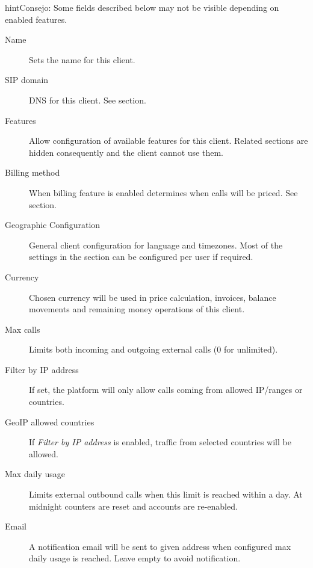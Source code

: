 \documentclass[letterpaper,10pt,spanish]{sphinxmanual}
\begin{document}
\begin{notice}{hint}{Consejo:}
Some fields described below may not be visible depending on enabled features.
\begin{description}
\item[{Name}] \leavevmode
Sets the name for this client.

\item[{SIP domain}] \leavevmode
DNS for this client. See {\hyperref[getting_started/internal_calls/brand_portal:client\string-sip\string-domain]{}} section.

\item[{Features}] \leavevmode
Allow configuration of available features for this client.
Related sections are hidden consequently and the client cannot use them.

\item[{Billing method}] \leavevmode
When billing feature is enabled determines when calls will be priced. See {\hyperref[administration_portal/brand/billing/index:billing]{}} section.

\item[{Geographic Configuration}] \leavevmode
General client configuration for language and timezones. Most of the settings in the section can be
configured per user if required.

\item[{Currency}] \leavevmode
Chosen currency will be used in price calculation, invoices, balance movements and
remaining money operations of this client.

\item[{Max calls}] \leavevmode
Limits both incoming and outgoing external calls (0 for unlimited).

\item[{Filter by IP address}] \leavevmode
If set, the platform will only allow calls coming from allowed IP/ranges or countries.

\item[{GeoIP allowed countries}] \leavevmode
If \emph{Filter by IP address} is enabled, traffic from selected countries will be allowed.

\item[{Max daily usage}] \leavevmode
Limits external outbound calls when this limit is reached within a day. At midnight counters are reset and
accounts are re-enabled.

\item[{Email}] \leavevmode
A notification email will be sent to given address when configured max daily usage is reached. Leave empty to
avoid notification.


\end{description}
\end{notice}
\end{document}
